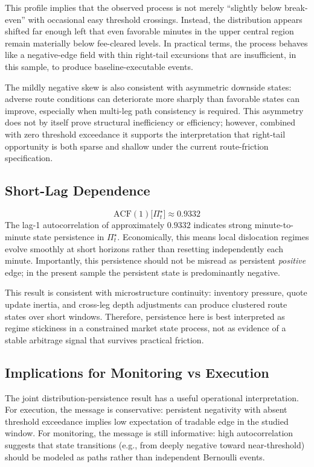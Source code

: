 \documentclass[11pt,a4paper]{article}
\begin{document}
This profile implies that the observed process is not merely ``slightly below break-even'' with occasional easy threshold crossings. Instead, the distribution appears shifted far enough left that even favorable minutes in the upper central region remain materially below fee-cleared levels. In practical terms, the process behaves like a negative-edge field with thin right-tail excursions that are insufficient, in this sample, to produce baseline-executable events.

The mildly negative skew is also consistent with asymmetric downside states: adverse route conditions can deteriorate more sharply than favorable states can improve, especially when multi-leg path consistency is required. This asymmetry does not by itself prove structural inefficiency or efficiency; however, combined with zero threshold exceedance it supports the interpretation that right-tail opportunity is both sparse and shallow under the current route-friction specification.

\subsection{Short-Lag Dependence}
\begin{equation}
\mathrm{ACF}(1)\big[\Pi^\star_t\big] \approx 0.9332
\end{equation}
The lag-1 autocorrelation of approximately $0.9332$ indicates strong minute-to-minute state persistence in $\Pi^\star_t$. Economically, this means local dislocation regimes evolve smoothly at short horizons rather than resetting independently each minute. Importantly, this persistence should not be misread as persistent \emph{positive} edge; in the present sample the persistent state is predominantly negative.

This result is consistent with microstructure continuity: inventory pressure, quote update inertia, and cross-leg depth adjustments can produce clustered route states over short windows. Therefore, persistence here is best interpreted as regime stickiness in a constrained market state process, not as evidence of a stable arbitrage signal that survives practical friction.

\subsection{Implications for Monitoring vs Execution}
The joint distribution-persistence result has a useful operational interpretation. For execution, the message is conservative: persistent negativity with absent threshold exceedance implies low expectation of tradable edge in the studied window. For monitoring, the message is still informative: high autocorrelation suggests that state transitions (e.g., from deeply negative toward near-threshold) should be modeled as paths rather than independent Bernoulli events.
\end{document}
